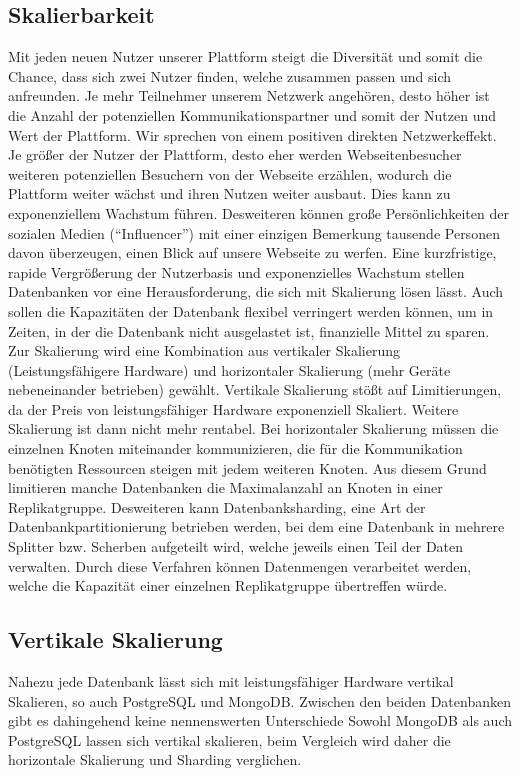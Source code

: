 \subsection{Skalierbarkeit}
Mit jeden neuen Nutzer unserer Plattform steigt die Diversität und somit die Chance, dass sich zwei Nutzer finden, welche zusammen passen und sich anfreunden. Je mehr Teilnehmer unserem Netzwerk angehören, desto höher ist die Anzahl der potenziellen Kommunikationspartner und somit der Nutzen und Wert der Plattform. Wir sprechen von einem positiven direkten Netzwerkeffekt. Je größer der Nutzer der Plattform, desto eher werden Webseitenbesucher weiteren potenziellen Besuchern von der Webseite erzählen, wodurch die Plattform weiter wächst und ihren Nutzen weiter ausbaut. Dies kann zu exponenziellem Wachstum führen. Desweiteren können große Persönlichkeiten der sozialen Medien (\enquote{Influencer}) mit einer einzigen Bemerkung tausende Personen davon überzeugen, einen Blick auf unsere Webseite zu werfen.
Eine kurzfristige, rapide Vergrößerung der Nutzerbasis und exponenzielles Wachstum stellen Datenbanken vor eine Herausforderung, die sich mit Skalierung lösen lässt. Auch sollen die Kapazitäten der Datenbank flexibel verringert werden können, um in Zeiten, in der die Datenbank nicht ausgelastet ist, finanzielle Mittel zu sparen. Zur Skalierung wird eine Kombination aus vertikaler Skalierung (Leistungsfähigere Hardware) und horizontaler Skalierung (mehr Geräte nebeneinander betrieben) gewählt. Vertikale Skalierung stößt auf Limitierungen, da der Preis von leistungsfähiger Hardware exponenziell Skaliert. Weitere Skalierung ist dann nicht mehr rentabel. Bei horizontaler Skalierung müssen die einzelnen Knoten miteinander kommunizieren, die für die Kommunikation benötigten Ressourcen steigen mit jedem weiteren Knoten. Aus diesem Grund limitieren manche Datenbanken die Maximalanzahl an Knoten in einer Replikatgruppe. \cite{MG6} Desweiteren kann Datenbanksharding, eine Art der Datenbankpartitionierung betrieben werden, bei dem eine Datenbank in mehrere Splitter bzw. Scherben aufgeteilt wird, welche jeweils einen Teil der Daten verwalten. Durch diese Verfahren können Datenmengen verarbeitet werden, welche die Kapazität einer einzelnen Replikatgruppe übertreffen würde.

\subsection{Vertikale Skalierung}
Nahezu jede Datenbank lässt sich mit leistungsfähiger Hardware vertikal Skalieren, so auch PostgreSQL und MongoDB. Zwischen den beiden Datenbanken gibt es dahingehend keine nennenswerten Unterschiede
Sowohl MongoDB als auch PostgreSQL lassen sich vertikal skalieren, beim Vergleich wird daher die horizontale Skalierung und Sharding verglichen.

